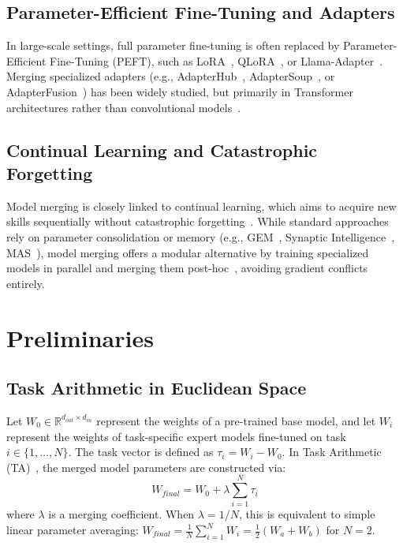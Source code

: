 \documentclass{article}
\begin{document}
\subsection{Parameter-Efficient Fine-Tuning and Adapters}
In large-scale settings, full parameter fine-tuning is often replaced by Parameter-Efficient Fine-Tuning (PEFT), such as LoRA~\cite{hu2021lora}, QLoRA~\cite{dettmers2023qlora}, or Llama-Adapter~\cite{zhang2023llama}. Merging specialized adapters (e.g., AdapterHub~\cite{pfeiffer2020adapterhub}, AdapterSoup~\cite{chronopoulou2023adaptersoup}, or AdapterFusion~\cite{pfeiffer2020adapterfusion}) has been widely studied, but primarily in Transformer architectures rather than convolutional models~\cite{jang2024merging,gu2023model}.

\subsection{Continual Learning and Catastrophic Forgetting}
Model merging is closely linked to continual learning, which aims to acquire new skills sequentially without catastrophic forgetting~\cite{kirkpatrick2017overcoming}. While standard approaches rely on parameter consolidation or memory (e.g., GEM~\cite{lopez2017gradient}, Synaptic Intelligence~\cite{zenke2017continual}, MAS~\cite{aljundi2018memory}), model merging offers a modular alternative by training specialized models in parallel and merging them post-hoc~\cite{anonymous2026saim}, avoiding gradient conflicts entirely.

\section{Preliminaries}
\label{sec:prelim}

\subsection{Task Arithmetic in Euclidean Space}
Let $W_0 \in \mathbb{R}^{d_{out} \times d_{in}}$ represent the weights of a pre-trained base model, and let $W_i$ represent the weights of task-specific expert models fine-tuned on task $i \in \{1, \dots, N\}$. 
The task vector is defined as $\tau_i = W_i - W_0$. 
In Task Arithmetic (TA)~\cite{ilharco2022editing}, the merged model parameters are constructed via:
\begin{equation}
    W_{final} = W_0 + \lambda \sum_{i=1}^{N} \tau_i
\end{equation}
where $\lambda$ is a merging coefficient. When $\lambda = 1/N$, this is equivalent to simple linear parameter averaging: $W_{final} = \frac{1}{N} \sum_{i=1}^N W_i = \frac{1}{2}(W_a + W_b)$ for $N=2$.
\end{document}
